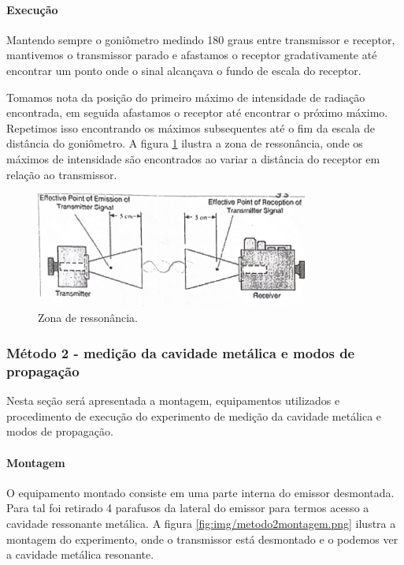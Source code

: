 \documentclass[12pt]{article}
\begin{document}
\paragraph{Execução}
Mantendo sempre o goniômetro medindo 180 graus entre transmissor e
receptor, mantivemos o transmissor parado e afastamos o receptor
gradativamente até encontrar um ponto onde o sinal alcançava o fundo
de escala do receptor.

Tomamos nota da posição do primeiro máximo de intensidade de radiação
encontrada, em seguida afastamos o receptor até encontrar o próximo
máximo. Repetimos isso encontrando os máximos subsequentes até o fim
da escala de distância do goniômetro. A figura
\ref{fig:img/metodo1cavidaderessonante.png}
ilustra a zona de ressonância, onde os máximos de intensidade
são encontrados ao variar a distância do receptor em relação ao
transmissor.

\begin{figure}[H]
  \centering
  \includegraphics[width=0.8\textwidth]{img/metodo1cavidaderessonante.png}
  \caption{Zona de ressonância.}
  \label{fig:img/metodo1cavidaderessonante.png}
\end{figure}

\subsubsection{Método 2 - medição da cavidade metálica e modos de propagação}
Nesta seção será apresentada a montagem, equipamentos utilizados e
procedimento de execução do experimento de medição da cavidade
metálica e modos de propagação.

\paragraph{Montagem}
O equipamento montado consiste em uma parte interna do emissor
desmontada. Para tal foi retirado 4 parafusos da lateral do emissor
para termos acesso a cavidade ressonante metálica. A figura
\ref{fig:img/metodo2montagem.png} ilustra a montagem do experimento,
onde o transmissor está desmontado e o podemos ver a cavidade metálica
resonante.
\end{document}
